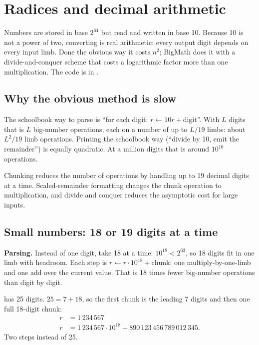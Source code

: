 \chapter{Radices and decimal arithmetic}
\label{ch:conv}

Numbers are stored in base $2^{64}$ but read and written in base 10. Because 10 is not a power
of two, converting is real arithmetic: every output digit depends on every input limb. Done
the obvious way it costs $n^2$; BigMath does it with a divide-and-conquer scheme that costs
a logarithmic factor more than one multiplication. The code is in .

\section{Why the obvious method is slow}

The schoolbook way to parse is ``for each digit: $r \leftarrow 10r + \text{digit}$''. With $L$
digits that is $L$ big-number operations, each on a number of up to $L/19$ limbs: about
$L^2/19$ limb operations. Printing the schoolbook way (``divide by 10, emit the remainder'') is
equally quadratic. At a million digits that is around $10^{10}$ operations.

Chunking reduces the number of operations by handling up to 19 decimal digits at a time.
Scaled-remainder formatting changes the chunk operation to multiplication, and
divide and conquer reduces the asymptotic cost for large inputs.

\section{Small numbers: 18 or 19 digits at a time}
\label{sec:linparse}

\textbf{Parsing.} Instead of one digit, take 18 at a time: $10^{18} < 2^{63}$, so 18 digits fit in
one limb with headroom. Each step is $r \leftarrow r \cdot 10^{18} + \text{chunk}$: one
multiply-by-one-limb and one add over the current value. That is 18 times fewer big-number
operations than digit by digit.

\begin{example}
 has 25 digits. $25 = 7 + 18$, so the first chunk is the
leading 7 digits and then one full 18-digit chunk:
\begin{align*}
r &= 1\,234\,567\\
r &= 1\,234\,567 \cdot 10^{18} + 890\,123\,456\,789\,012\,345 .
\end{align*}
Two steps instead of 25.
\end{example}

